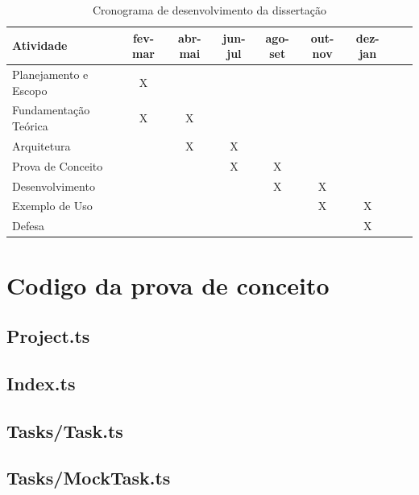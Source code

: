 \documentclass[12pt]{tcc}
\begin{document}
\begin{table}[!ht]
	\centering
	\caption{Cronograma de desenvolvimento da dissertação}
	\begin{tabular}{l  c  c  c  c  c  c L{1.5cm} R{1.5cm}}
		\toprule
		\textbf{Atividade} & \textbf{fev-mar} & \textbf{abr-mai} & \textbf{jun-jul} & \textbf{ago-set} & \textbf{out-nov} & \textbf{dez-jan} \\
		\midrule
		Planejamento e Escopo  &  X  &    &    &    &    &    \\
		Fundamentação Teórica  &  X  &  X  &    &    &    &    \\
		Arquitetura  &    &  X  &  X  &    &    &    \\
		Prova de Conceito  &    &    &  X  &  X  &    &    \\
		Desenvolvimento  &    &    &    &  X  &  X  &    \\
		Exemplo de Uso  &    &    &    &    &  X  &  X  \\
		Defesa  &    &    &    &    &    &  X  \\
		\bottomrule
	\end{tabular}
	\label{tab:cronograma}
\end{table}

\section{Codigo da prova de conceito}

\subsection{Project.ts}


\subsection{Index.ts}


\subsection{Tasks/Task.ts}


\subsection{Tasks/MockTask.ts}

\end{document}
